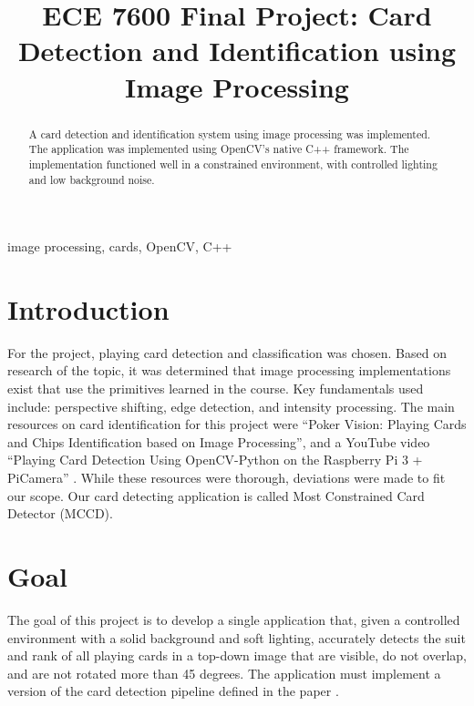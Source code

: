 \documentclass[conference]{IEEEtran}
\begin{document}
\title{ECE 7600 Final Project:
Card Detection and Identification using Image Processing
}

\author{
\and
{}
}

\maketitle

\begin{abstract}
    A card detection and identification system using image processing was implemented. The
    application was implemented using OpenCV's native C++ framework. The implementation functioned
    well in a constrained environment, with controlled lighting and low background noise.
\end{abstract}

\begin{IEEEkeywords}
image processing, cards, OpenCV, C++
\end{IEEEkeywords}

\section{Introduction}
For the project, playing card detection and classification was chosen. Based on research of the
topic, it was determined that image processing implementations exist that use the primitives learned
in the course. Key fundamentals used include: perspective shifting, edge detection, and intensity
processing. The main resources on card identification for this project were ``Poker Vision: Playing
Cards and Chips Identification based on Image Processing'', and a YouTube video ``Playing Card
Detection Using OpenCV-Python on the Raspberry Pi 3 + PiCamera''
\cite{opencv-card-detection}\cite{poker-vision}. While these resources were thorough, deviations
were made to fit our scope. Our card detecting application is called Most Constrained Card Detector
(MCCD).

\section{Goal}
The goal of this project is to develop a single application that, given a controlled environment
with a solid background and soft lighting, accurately detects the suit and rank of all playing cards
in a top-down image that are visible, do not overlap, and are not rotated more than 45 degrees. The
application must implement a version of the card detection pipeline defined in the paper
\cite{poker-vision}.
\end{document}
